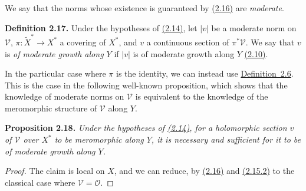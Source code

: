 \documentclass{report}
\newenvironment{itenv}[1]
  {\phantomsection\par\medskip\noindent\textbf{#1.}\itshape}
  {\medskip}
\newenvironment{rmenv}[1]
  {\phantomsection\par\medskip\noindent\textbf{#1.}\rmfamily}
  {\medskip}
\renewcommand{\cal}[1]{{\mathcal{#1}}}
\newcommand{\oldpage}[1]{\marginpar{\footnotesize$\Big\vert$ \textit{p.~#1}}}
\begin{document}
We say that the norms whose existence is guaranteed by \hyperref[II.2.16]{(2.16)} are \emph{moderate}.

\oldpage{68}
\begin{rmenv}{Definition 2.17}
\label{II.2.17}
  Under the hypotheses of \hyperref[II.2.14]{(2.14)}, let $|v|$ be a moderate norm on $\cal{V}$, $\pi\colon\widetilde{X}^*\to X^*$ a covering of $X^*$, and $v$ a continuous section of $\pi^*\cal{V}$.
  We say that $v$ is \emph{of moderate growth along $Y$} if $|v|$ is of moderate growth along $Y$ \hyperref[II.2.10]{(2.10)}.
\end{rmenv}

In the particular case where $\pi$ is the identity, we can instead use \hyperref[II.2.6]{Definition~2.6}.
This is the case in the following well-known proposition, which shows that the knowledge of moderate norms on $\cal{V}$ is equivalent to the knowledge of the meromorphic structure of $\cal{V}$ along $Y$.

\begin{itenv}{Proposition 2.18}
\label{II.2.18}
  Under the hypotheses of \hyperref[II.2.14]{(2.14)}, for a holomorphic section $v$ of $\cal{V}$ over $X^*$ to be meromorphic along $Y$, it is necessary and sufficient for it to be of moderate growth along $Y$.
\end{itenv}

\begin{proof}
  The claim is local on $X$, and we can reduce, by \hyperref[II.2.16]{(2.16)} and \hyperref[II.2.15.2]{(2.15.2)} to the classical case where $\cal{V}=\cal{O}$.
\end{proof}
\end{document}
